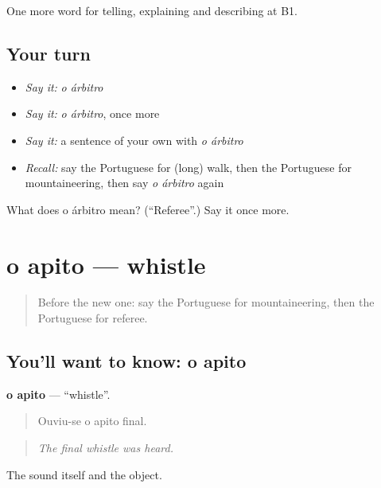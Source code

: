 \begin{grammarlens}[title={What you've built}]
One more word for telling, explaining and describing at B1.
\end{grammarlens}

\subsection*{Your turn}
\begin{itemize}
\raggedright
  \item \emph{Say it:} \emph{o árbitro}
  \item \emph{Say it:} \emph{o árbitro}, once more
  \item \emph{Say it:} a sentence of your own with \emph{o árbitro}
  \item \emph{Recall:} say the Portuguese for (long) walk, then the Portuguese for mountaineering, then say \emph{o árbitro} again
\end{itemize}

\begin{tcolorbox}[breakable,colback=teal!4,colframe=teal!35!black,title={Before you move on}]
What does o árbitro mean? (\textquotedblleft{}Referee\textquotedblright{}.) Say it once more.
\end{tcolorbox}
\section[o apito]{o apito — whistle}

\label{lesson:PT-C508-apito}



\begin{quote}
Before the new one: say the Portuguese for mountaineering, then the Portuguese for referee.
\end{quote}

\subsection*{You'll want to know: o apito}
\textbf{o apito} — \textquotedblleft{}whistle\textquotedblright{}.

\begin{quote}
Ouviu-se o apito final.
\end{quote}

\begin{quote}
\emph{The final whistle was heard.}
\end{quote}

The sound itself and the object.

